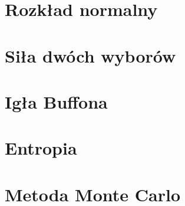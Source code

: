 \documentclass[12pt, a4paper, polish, openany]{book}
\begin{document}
\chapter{Rozkład normalny}


\chapter{Siła dwóch wyborów}


\chapter{Igła Buffona}


\chapter{Entropia}


\chapter{Metoda Monte Carlo}

\end{document}
